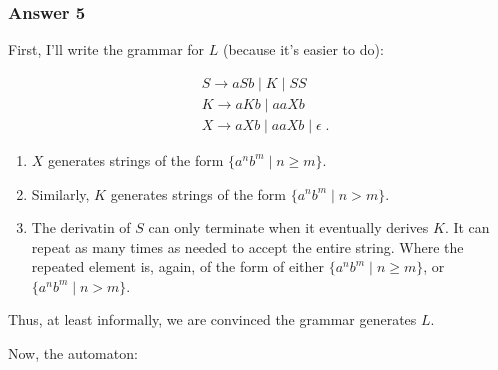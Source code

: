 \documentclass[11pt]{article}
\begin{document}
\subsubsection{Answer 5}
\label{sec-1-3-1}
First, I'll write the grammar for $L$ (because it's easier to do):

\begin{align*}
  &S \to aSb \;|\; K \;|\; SS \\
  &K \to aKb \;|\; aaXb \\
  &X \to aXb \;|\; aaXb \;|\; \epsilon \;.
\end{align*}

\begin{enumerate}
\item $X$ generates strings of the form $\{ a^nb^m \;|\; n \geq m \}$.
\item Similarly, $K$ generates strings of the form $\{ a^nb^m \;|\; n > m \}$.
\item The derivatin of $S$ can only terminate when it eventually derives $K$.
It can repeat as many times as needed to accept the entire string.  Where
the repeated element is, again, of the form of either $\{ a^nb^m \;|\; n
       \geq m \}$, or $\{ a^nb^m \;|\; n > m \}$.
\end{enumerate}

Thus, at least informally, we are convinced the grammar generates $L$.

Now, the automaton:
\end{document}
